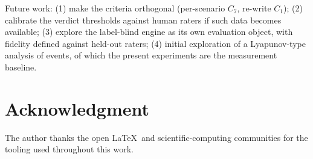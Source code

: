 \documentclass[journal]{IEEEtran}
\begin{document}
Future work: (1) make the criteria orthogonal (per-scenario $C_7$,
re-write $C_1$); (2) calibrate the verdict thresholds against human
raters if such data becomes available; (3) explore the label-blind
engine as its own evaluation object, with fidelity defined against
held-out raters; (4) initial exploration of a Lyapunov-type analysis of
events, of which the present experiments are the measurement baseline.

\section*{Acknowledgment}
The author thanks the open \LaTeX\ and scientific-computing communities
for the tooling used throughout this work.



\end{document}
